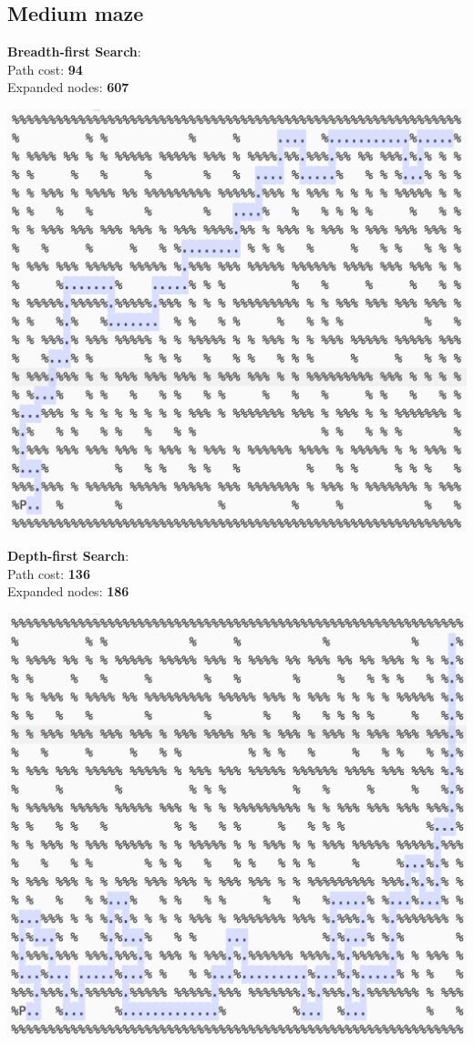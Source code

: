 \documentclass[11pt]{article}
\begin{document}
\subsection*{Medium maze}
\textbf{Breadth-first Search}:\\
Path cost: \textbf{94}\\
Expanded nodes: \textbf{607}
\begin{center}
\includegraphics[scale=0.6]{medium-maze/bfs.png}
\end{center}
\pagebreak

\textbf{Depth-first Search}:\\
Path cost: \textbf{136}\\
Expanded nodes: \textbf{186}
\begin{center}
\includegraphics[scale=0.8]{medium-maze/dfs.png}
\end{center}
\pagebreak
\end{document}
